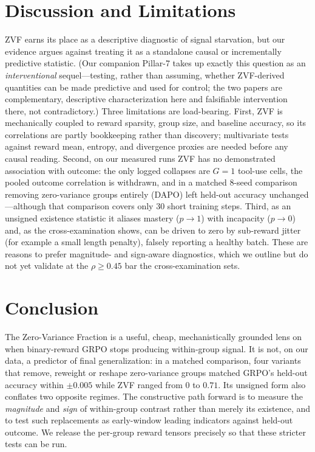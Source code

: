 \section{Discussion and Limitations}
\label{sec:p2-discussion}
ZVF earns its place as a descriptive diagnostic of signal starvation, but our
evidence argues against treating it as a standalone causal or incrementally
predictive statistic. (Our companion Pillar-7 takes up exactly this question as an
\emph{interventional} sequel---testing, rather than assuming, whether ZVF-derived
quantities can be made predictive and used for control; the two papers are
complementary, descriptive characterization here and falsifiable intervention there,
not contradictory.) Three limitations are load-bearing. First, ZVF is
mechanically coupled to reward sparsity, group size, and baseline accuracy, so its
correlations are partly bookkeeping rather than discovery; multivariate tests
against reward mean, entropy, and divergence proxies are needed before any causal
reading. Second, on our measured runs ZVF has no demonstrated association with
outcome: the only logged collapses are $G{=}1$ tool-use cells, the pooled outcome
correlation is withdrawn, and in a matched 8-seed comparison removing
zero-variance groups entirely (DAPO) left held-out accuracy unchanged---although
that comparison covers only 30 short training steps. Third, as an unsigned existence statistic it aliases mastery
($p \to 1$) with incapacity ($p \to 0$) and, as the cross-examination shows, can be
driven to zero by sub-reward jitter (for example a small length penalty), falsely
reporting a healthy batch. These are reasons to prefer magnitude- and sign-aware
diagnostics, which we outline but do not yet validate at the $\rho \geq 0.45$ bar
the cross-examination sets.

\section{Conclusion}
\label{sec:p2-conclusion}
The Zero-Variance Fraction is a useful, cheap, mechanistically grounded lens on
when binary-reward GRPO stops producing within-group signal. It is not, on our
data, a predictor of final generalization: in a matched comparison, four variants
that remove, reweight or reshape zero-variance groups matched GRPO's held-out
accuracy within $\pm0.005$ while ZVF ranged from $0$ to $0.71$. Its unsigned form
also conflates two opposite regimes. The constructive path forward is to measure the \emph{magnitude}
and \emph{sign} of within-group contrast rather than merely its existence, and to
test such replacements as early-window leading indicators against held-out outcome.
We release the per-group reward tensors precisely so that these stricter tests can
be run.
